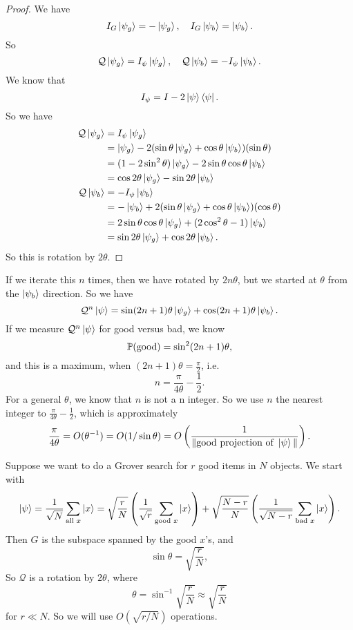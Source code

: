 \begin{proof}
  We have
  \[
    I_G \bket{\psi_g} = - \bket{\psi_g},\quad I_G \bket{\psi_b} = \bket{\psi_b}.
  \]
  So
  \[
    \mathcal{Q} \bket{\psi_g} = I_\psi \bket{\psi_g}, \quad \mathcal{Q} \bket{\psi_b} = - I_\psi \bket{\psi_b}.
  \]
  We know that
  \[
    I_\psi = I - 2\bket{\psi}\brak{\psi}.
  \]
  So we have
  \begin{align*}
    \mathcal{Q} \bket{\psi_g} &= I_\psi \bket{\psi_g}\\
    &= \bket{\psi_g} - 2(\sin \theta \bket{\psi_g} + \cos \theta \bket{\psi_b})(\sin \theta)\\
    &= (1 - 2 \sin^2 \theta) \bket{\psi_g} - 2 \sin \theta \cos \theta \bket{\psi_b}\\
    &= \cos 2\theta \bket{\psi_g} - \sin 2\theta \bket{\psi_b}\\
    \mathcal{Q} \bket{\psi_b} &= - I_\psi \bket{\psi_b}\\
    &= -\bket{\psi_b} + 2(\sin \theta \bket{\psi_g} + \cos \theta \bket{\psi_b})(\cos \theta)\\
    &= 2 \sin \theta \cos \theta \bket{\psi_g} + (2\cos^2 \theta - 1) \bket{\psi_b}\\
    &= \sin 2 \theta \bket{\psi_g} + \cos 2 \theta \bket{\psi_b}.
  \end{align*}
  So this is rotation by $2 \theta$.
\end{proof}

If we iterate this $n$ times, then we have rotated by $2n \theta$, but we started at $\theta$ from the $\bket{\psi_b}$ direction. So we have
\[
  \mathcal{Q}^n \bket{\psi} = \sin (2n + 1) \theta \bket{\psi_g} + \cos (2n + 1) \theta \bket{\psi_b}.
\]
If we measure $\mathcal{Q}^n\bket{\psi}$ for good versus bad, we know
\[
  \P(\text{good}) = \sin^2 (2n + 1)\theta,
\]
and this is a maximum, when $(2n + 1) \theta = \frac{\pi}{2}$, i.e.
\[
  n = \frac{\pi}{4 \theta} - \frac{1}{2}.
\]
For a general $\theta$, we know that $n$ is not a n integer. So we use $n$ the nearest integer to $\frac{\pi}{4 \theta} - \frac{1}{2}$, which is approximately
\[
  \frac{\pi}{4 \theta} = O(\theta^{-1}) = O(1/\sin \theta) = O\left(\frac{1}{\|\text{good projection of }\bket{\psi}\|}\right).
\]

\begin{eg}
  Suppose we want to do a Grover search for $r$ good items in $N$ objects. We start with
  \[
    \bket{\psi} = \frac{1}{\sqrt{N}} \sum_{\text{all }x} \bket{x} = \sqrt{\frac{r}{N}}\left(\frac{1}{\sqrt{r}} \sum_{\text{good }x} \bket{x}\right) + \sqrt{\frac{N - r}{N}}\left(\frac{1}{\sqrt{N - r}} \sum_{\text{bad }x} \bket{x}\right).
  \]
  Then $G$ is the subspace spanned by the good $x$'s, and
  \[
    \sin \theta =\sqrt{\frac{r}{N}},
  \]
  So $\mathcal{Q}$ is a rotation by $2\theta$, where
  \[
    \theta = \sin^{-1}\sqrt{\frac{r}{N}} \approx \sqrt{\frac{r}{N}}
  \]
  for $r \ll N$. So we will use $O(\sqrt{r/N})$ operations.
\end{eg}


